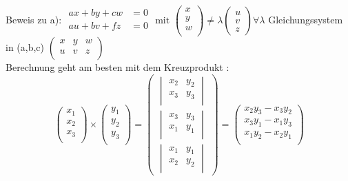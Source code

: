 \documentclass[11pt]{article}
\begin{document}
Beweis zu a):
$\begin{array}{cc}
ax + by + cw &  = 0 \\ 
au + bv + fz &= 0 \\ 
\end{array} \text{ mit }
\begin{pmatrix}
x \\ y \\ w \\
\end{pmatrix} \neq \lambda \begin{pmatrix}
u \\ v \\ z 
\end{pmatrix}
\forall \lambda $
Gleichungssystem in (a,b,c) $\begin{pmatrix}
x & y & w \\
u & v & z \\
\end{pmatrix}$\\
Berechnung geht am besten mit dem Kreuzprodukt :
$$ \begin{pmatrix}
x_1 \\ x_2 \\ x_3 \\
\end{pmatrix}
\times
\begin{pmatrix}
y_1 \\ y_2 \\ y_3 \\
\end{pmatrix}
=
\begin{pmatrix}
\begin{vmatrix}
x_2 & y_2 \\
x_3 & y_3 \\ 
\end{vmatrix}\\
\begin{vmatrix}
x_3 & y_3 \\
x_1 & y_1 \\ 
\end{vmatrix}\\
\begin{vmatrix}
x_1 & y_1 \\
x_2 & y_2 \\ 
\end{vmatrix}
\end{pmatrix} =
\begin{pmatrix}
x_2y_3 - x_3y_2 \\
x_3y_1 - x_1y_3 \\
x_1y_2 - x_2y_1 \\
\end{pmatrix}
$$
\end{document}
